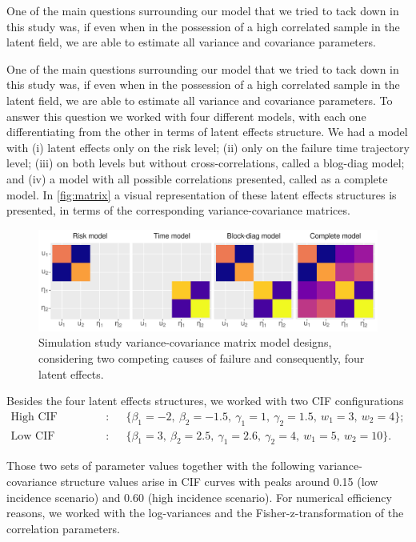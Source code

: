 \documentclass[a4paper,12pt]{article}
\begin{document}
One of the main questions surrounding our model that we tried to tack
down in this study was, if even when in the possession of a high
correlated sample in the latent field, we are able to estimate all
variance and covariance parameters.

One of the main questions surrounding our model that we tried to tack
down in this study was, if even when in the possession of a high
correlated sample in the latent field, we are able to estimate all
variance and covariance parameters. To answer this question we worked
with four different models, with each one differentiating from the other
in terms of latent effects structure. We had a model with (i) latent
effects only on the risk level; (ii) only on the failure time trajectory
level; (iii) on both levels but without cross-correlations, called a
blog-diag model; and (iv) a model with all possible correlations
presented, called as a complete model. In \autoref{fig:matrix} a visual
representation of these latent effects structures is presented, in terms
of the corresponding variance-covariance matrices.

\begin{figure}[H]
 \centering \includegraphics[width=\linewidth]{pics/matrix-1.png}
 \vspace{-0.75cm}
 \caption{Simulation study variance-covariance matrix model designs,
   considering two competing causes of failure and consequently, four
   latent effects.}
 \label{fig:matrix}
\end{figure}

Besides the four latent effects structures, we worked with two CIF
configurations
\begin{align*}
 \text{High CIF configuration}:~&\quad
 \{\beta_{1} = -2,~\beta_{2} = -1.5,~\gamma_{1} = 1,~\gamma_{2} = 1.5,~
   w_{1} = 3,~w_{2} = 4
 \};\\
 \text{Low CIF configuration}:~&\quad
 \{\beta_{1} = 3,~\beta_{2} = 2.5,~\gamma_{1} = 2.6,~\gamma_{2} = 4,~
   w_{1} = 5,~w_{2} = 10
 \}.
\end{align*}

Those two sets of parameter values together with the following
variance-covariance structure values arise in CIF curves with peaks
around 0.15 (low incidence scenario) and 0.60 (high incidence scenario).
For numerical efficiency reasons, we worked with the log-variances and
the Fisher-z-transformation of the correlation parameters.
\end{document}
